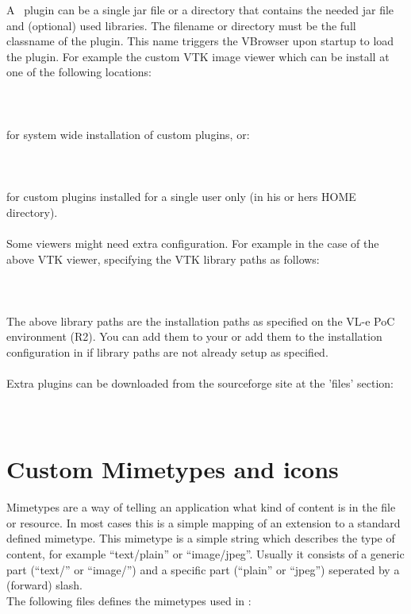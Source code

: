 A \vbrowser\ plugin can be a single jar file or a directory that contains the needed
jar file and (optional) used libraries. The filename or directory must 
be the full classname of the plugin. 
This name triggers the VBrowser upon startup to load the plugin. 
For example the custom VTK image viewer which can be install at one of the
following locations:\\
\\
\tab {}\\
\\	
for system wide installation of custom plugins, or:\\
\\
\tab {}\\
\\
for custom plugins installed for a single user only (in his or hers HOME directory). \\
\\
Some viewers might need extra configuration. For example in the case of
the above VTK viewer, specifying the VTK library paths as follows:\\
\\
\tab {}\\
\\
The above library paths are the installation paths as specified on the VL-e PoC
environment (R2). You can add them to your  or add them to the
installation configuration in  if library
paths are not already setup as specified. \\
\\
Extra plugins can be downloaded from the sourceforge site at the 'files'
section:\\
\\
\tab {}
\\

\section{Custom Mimetypes and icons}

Mimetypes are a way of telling an application what kind of content is in the
file or resource. In most cases this is a simple mapping of an extension to a 
standard defined mimetype. This mimetype is a simple string which describes 
the type of content, for example ``text/plain'' or ``image/jpeg''. Usually it
consists of a generic part (``text/'' or ``image/'') and a specific part
(``plain'' or ``jpeg'') seperated by a (forward) slash.\\ 
The following files defines the mimetypes used in \VLET:

